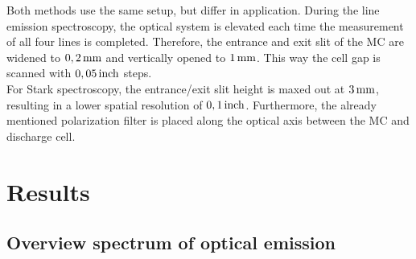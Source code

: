 \documentclass[a4paper,10pt,twoside]{article}
\begin{document}
			Both methods use the same setup, but differ in application. During the line emission spectroscopy, the optical system is elevated each time the measurement of all four lines is completed. Therefore, the entrance and exit slit of the MC are widened to $\unit[0,2]{mm}$ and vertically opened to $\unit[1]{mm}$. This way the cell gap is scanned with $\unit[0,05]{inch}$ steps.\\
			For Stark spectroscopy, the entrance/exit slit height is maxed out at $\unit[3]{mm}$, resulting in a lower spatial resolution of $\unit[0,1]{inch}$. Furthermore, the already mentioned polarization filter is placed along the optical axis between the MC and discharge cell.

	\section{Results}

		\subsection{Overview spectrum of optical emission}\label{subsec:overview}
		
\end{document}
